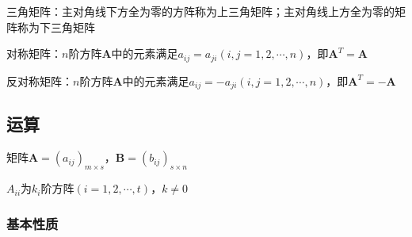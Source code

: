 \documentclass[12pt]{book}
\begin{document}
\par 三角矩阵：主对角线下方全为零的方阵称为上三角矩阵；主对角线上方全为零的矩阵称为下三角矩阵
\par 对称矩阵：$n$阶方阵$\bm{A}$中的元素满足$a_{ij}=a_{ji} (i,j=1,2,\cdots,n)$，即$\bm{A}^T=\bm{A}$
\par 反对称矩阵：$n$阶方阵$\bm{A}$中的元素满足$a_{ij}=-a_{ji} (i,j=1,2,\cdots,n)$，即$\bm{A}^T=-\bm{A}$

















\subsection{运算}
矩阵$\mathbf{A}=(a_{ij})_{m\times s}$，$\mathbf{B}=(b_{ij})_{s\times n}$

$A_{ii}$为$k_i$阶方阵$(i=1,2,\cdots,t)$，$k\neq 0$

\subsubsection{基本性质}
\end{document}
